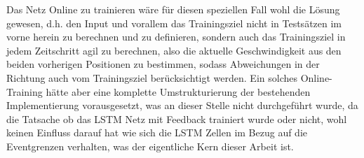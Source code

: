 \begin{description}
	Das Netz Online zu trainieren wäre für diesen speziellen Fall wohl die Lösung gewesen, d.h. den Input und vorallem das Trainingsziel nicht in Testsätzen im vorne herein zu berechnen und zu definieren, sondern auch das Trainingsziel in jedem Zeitschritt agil zu berechnen, also die aktuelle Geschwindigkeit aus den beiden vorherigen Positionen zu bestimmen, sodass Abweichungen in der Richtung auch vom Trainingsziel berücksichtigt werden. Ein solches Online-Training hätte aber eine komplette Umstrukturierung der bestehenden Implementierung vorausgesetzt, was an dieser Stelle nicht durchgeführt wurde, da die Tatsache ob das LSTM Netz mit Feedback trainiert wurde oder nicht, wohl keinen Einfluss darauf hat wie sich die LSTM Zellen im Bezug auf die Eventgrenzen verhalten, was der eigentliche Kern dieser Arbeit ist. 
\end{description}

